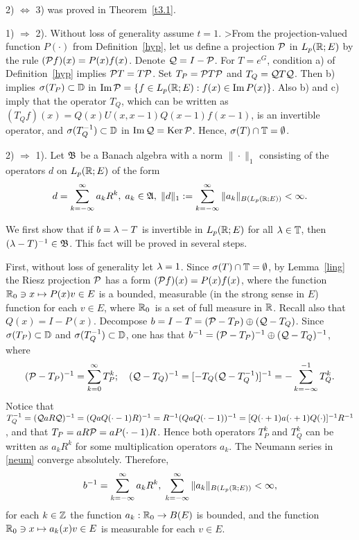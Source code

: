 \begin{pf}
2) $\Leftrightarrow$ 3) was proved in Theorem~\ref{t3.1}.


1) $\Rightarrow$ 2).
Without loss
of generality assume $t=1$.
>From the projection-valued function $P(\cdot)$ from
Definition~\ref{hyp}, let us define a
projection ${\cal{P}}$ in $L_p({\Bbb{R}};E)$ by the rule $({\cal{P}} f)(x) =P(x) f(x)$.
Denote ${\cal{Q}} =I-{\cal{P}}$.  For $T=e^G$, condition a)
of Definition~\ref{hyp} implies ${\cal{P}} T =T{\cal{P}}$.
Set $T_P ={\cal{P}} T {\cal{P}}$ and $T_Q ={\cal{Q}} T{\cal{Q}}$. Then b) implies
$\sigma (T_P)\subset
{\Bbb{D}}$ in $\operatorname{Im} {\cal{P}} =\{f\in L_p ({\Bbb{R}};E): f(x) \in \operatorname{Im} P(x)\}$.  Also b)
and c) imply that the operator $T_Q$,
which can be written as
$(T_Qf)(x) =Q(x) U(x,x-1) Q(x-1)f(x-1)$, is
an invertible operator, and
$\sigma (T^{-1}_Q)\subset{\Bbb{D}}$ in $\operatorname{Im} {\cal{Q}} =\operatorname{Ker} {\cal{P}}$.
Hence, $\sigma (T) \cap {\Bbb{T}} =\emptyset$.

2) $\Rightarrow$ 1).  Let ${\frak{B}}$ be
a Banach algebra with a norm $\|\cdot \|_1$
consisting of the operators $d$ on
$L_p({\Bbb{R}};E)$ of the form
$$
d=\sum_{k=-\infty}^\infty a_k R^k, \; a_k \in{\frak{A}},\; \|d\|_1 :
=\sum_{k=-\infty}^\infty \| a_k\|_{B(L_p ({\Bbb{R}};E))} < \infty.
$$

We first show that if $b=\lambda -T$ is invertible in $L_p({\Bbb{R}};E)$ for all
$\lambda \in {\Bbb{T}}$, then $(\lambda -T)^{-1} \in {\frak{B}}$. This fact will be proved
in several steps.

First, without loss of generality let $\lambda=1$.  Since $\sigma (T) \cap
{\Bbb{T}}=\emptyset$, by Lemma~\ref{ling} the Riesz projection ${\cal{P}}$ has a form
$({\cal{P}} f)(x)=P(x) f(x)$, where
the function ${\Bbb{R}}_0 \ni x \mapsto P(x) v\in E$ is a
bounded, measurable (in the strong sense in $E$) function for each $v\in E$,
where ${\Bbb{R}}_0$\ is a set of full measure in ${\Bbb{R}}$.
Recall also that $Q(x)=I-P(x)$.
Decompose $b=I-T=({\cal{P}} -T_P) \oplus ({\cal{Q}}-T_Q)$.
Since $\sigma (T_P) \subset
{\Bbb{D}}$ and $\sigma (T^{-1}_Q )\subset {\Bbb{D}}$, one has that
$b^{-1}=({\cal{P}} -T_P)^{-1} \oplus ({\cal{Q}}-T_Q)^{-1}$, where
\begin{equation}
(\calP -T_P )^{-1} =\sum_{k=0}^\infty T_P^k;
\quad (\calQ-T_Q)^{-1}=[-T_Q
(\calQ-T_Q^{-1})]^{-1} =-\sum_{k=-\infty}^{-1} T_Q^k.
\lb{neum}
\end{equation}
Notice
that $T_Q^{-1} =({\cal{Q}} aR{\cal{Q}})^{-1} =(QaQ(\cdot -1) R)^{-1} = R^{-1} (QaQ
(\cdot -1))^{-1} =[Q(\cdot +1) a(\cdot +1) Q(\cdot)]^{-1} R^{-1}$, and
that $T_P=aR{\cal{P}} =aP(\cdot -1) R$.
Hence both operators $T_P^k$ and $T_Q^k$ can be written as $a_kR^k$
for some multiplication operators $a_k$.
The Neumann series in \eqref{neum} converge
absolutely.  Therefore,
\begin{equation}
b^{-1} =\sum_{k=-\infty}^\infty a_k R^k,\; \sum_{k=-\infty}^\infty
\|a_k\|_{B(L_p (\bbR;E))} < \infty,
\lb{invb}
\end{equation}
for each $k\in{\Bbb{Z}}$ the function $a_k: {\Bbb{R}}_0 \to B(E)$ is bounded, and
the function
${\Bbb{R}}_0 \ni x\mapsto a_k(x) v\in E$ is measurable for each $v\in E$.


\end{pf}
